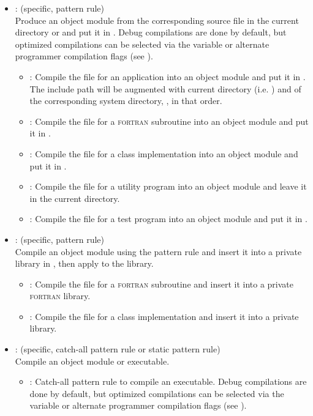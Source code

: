 \begin{itemize}
\item
    : (specific, pattern rule)
   \\ Produce an object module from the corresponding source file in the
   current directory or  and put it in .
   Debug compilations are done by default, but optimized compilations can be
   selected via the  variable or alternate programmer compilation
   flags (see ).
   \begin{itemize}
   \item
      : Compile the  file for an application into an
      object module and put it in .  The include path will
      be augmented with current directory (i.e. ) and of the
      corresponding system directory, , in that order.
   \item
      : Compile the  file for a \textsc{fortran} subroutine into
      an object module and put it in .
   \item
      : Compile the  file for a  class
      implementation into an object module and put it in .
   \item
      : Compile the  file for a utility program into an
      object module and leave it in the current directory.
   \item
      : Compile the  file for a test program into an
      object module and put it in .
   \end{itemize}

\item
    : (specific, pattern rule)
   \\ Compile an object module using the  pattern rule and insert it
   into a private library in , then apply 
   to the library.
   \begin{itemize}
   \item
      : Compile the  file for a \textsc{fortran} subroutine
      and insert it into a private \textsc{fortran} library.
   \item
      : Compile the  file for a  class
      implementation and insert it into a private  library.
   \end{itemize}

\item
   \code{\%} : (specific, catch-all pattern rule or static pattern rule)
   \\ Compile an object module or executable.
   \begin{itemize}
   \item
      : Catch-all pattern rule to compile an executable.  Debug
      compilations are done by default, but optimized compilations can be
      selected via the  variable or alternate programmer compilation
      flags (see ).


\end{itemize}
\end{itemize}
